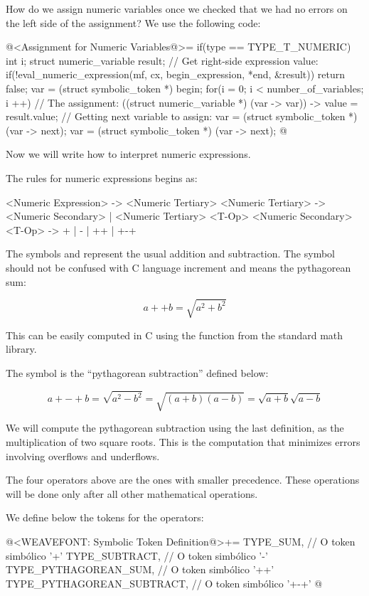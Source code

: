 How do we assign numeric variables once we checked that we had no
errors on the left side of the assignment? We use the following code:

\iniciocodigo
@<Assignment for Numeric Variables@>=
if(type == TYPE_T_NUMERIC){
  int i;
  struct numeric_variable result;
  // Get right-side expression value:
  if(!eval_numeric_expression(mf, cx, begin_expression, *end, &result))
    return false;
  var = (struct symbolic_token *) begin;
  for(i = 0; i < number_of_variables; i ++){
    // The assignment:
    ((struct numeric_variable *) (var -> var)) -> value = result.value;
    // Getting next variable to assign:
    var = (struct symbolic_token *) (var -> next);
    var = (struct symbolic_token *) (var -> next);
  }
}
@
\fimcodigo

Now we will write how to interpret numeric expressions.


The rules for numeric expressions begins as:

\alinhaverbatim
<Numeric Expression> -> <Numeric Tertiary>
<Numeric Tertiary> -> <Numeric Secondary> |
                      <Numeric Tertiary> <T-Op> <Numeric Secondary>
<T-Op> -> + | - | ++ | +-+
\alinhanormal

The symbols \monoespaco{+} and \monoespaco{-} represent the usual
addition and subtraction. The symbol \monoespaco{++} should not be
confused with C language increment and means the pythagorean sum:

$$
a ++ b = \sqrt{a^2 + b^2}
$$

This can be easily computed in C using the
function  from the standard math library.

The symbol \monoespaco{+-+} is the ``pythagorean subtraction'' defined
below:

$$
a +-+ b = \sqrt{a^2 - b^2} = \sqrt{(a+b)(a-b)} = \sqrt{a+b}\sqrt{a-b}
$$

We will compute the pythagorean subtraction using the last definition,
as the multiplication of two square roots. This is the computation
that minimizes errors involving overflows and underflows.

The four operators above are the ones with smaller precedence. These
operations will be done only after all other mathematical operations.

We define below the tokens for the operators:

\iniciocodigo
@<WEAVEFONT: Symbolic Token Definition@>+=
TYPE_SUM,                   // O token simbólico '+'
TYPE_SUBTRACT,              // O token simbólico '-'
TYPE_PYTHAGOREAN_SUM,       // O token simbólico '++'
TYPE_PYTHAGOREAN_SUBTRACT,  // O token simbólico '+-+'
@
\fimcodigo

